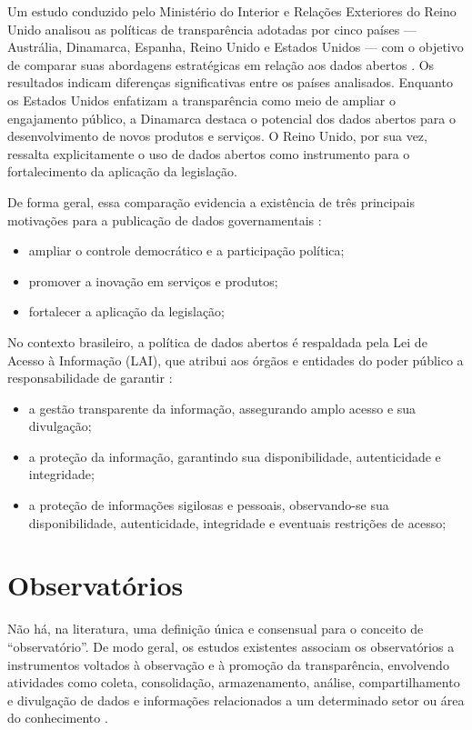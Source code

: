 Um estudo conduzido pelo Ministério do Interior e Relações Exteriores do Reino Unido analisou as políticas de transparência adotadas por cinco países — Austrália, Dinamarca, Espanha, Reino Unido e Estados Unidos — com o objetivo de comparar suas abordagens estratégicas em relação aos dados abertos \cite{huijboom2011open}. Os resultados indicam diferenças significativas entre os países analisados. Enquanto os Estados Unidos enfatizam a transparência como meio de ampliar o engajamento público, a Dinamarca destaca o potencial dos dados abertos para o desenvolvimento de novos produtos e serviços. O Reino Unido, por sua vez, ressalta explicitamente o uso de dados abertos como instrumento para o fortalecimento da aplicação da legislação.

De forma geral, essa comparação evidencia a existência de três principais motivações para a publicação de dados governamentais \cite{huijboom2011open}:
\begin{itemize}
    \item ampliar o controle democrático e a participação política;
    \item promover a inovação em serviços e produtos;
    \item fortalecer a aplicação da legislação;
\end{itemize}

No contexto brasileiro, a política de dados abertos é respaldada pela Lei de Acesso à Informação (LAI), que atribui aos órgãos e entidades do poder público a responsabilidade de garantir \cite{L12527}:
\begin{itemize}
    \item a gestão transparente da informação, assegurando amplo acesso e sua divulgação;
    \item a proteção da informação, garantindo sua disponibilidade, autenticidade e integridade;
    \item a proteção de informações sigilosas e pessoais, observando-se sua disponibilidade, autenticidade, integridade e eventuais restrições de acesso;
\end{itemize}

\section{Observatórios}
Não há, na literatura, uma definição única e consensual para o conceito de “observatório”. De modo geral, os estudos existentes associam os observatórios a instrumentos voltados à observação e à promoção da transparência, envolvendo atividades como coleta, consolidação, armazenamento, análise, compartilhamento e divulgação de dados e informações relacionados a um determinado setor ou área do conhecimento \cite{sakata2013construccao, tinati2015building, vieira2021model, keever2017decada}.

